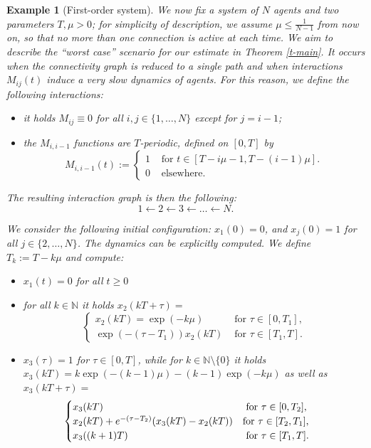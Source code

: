 \documentclass[journal]{article}
\newtheorem{example}{Example}
\begin{document}
 
\begin{example}[First-order system]\label{ex-1}We now fix a system of $N$ agents and two parameters $T,\mu>0$; for simplicity of description, we assume $\mu\leq \frac1{N-1}$ from now on, so that no more than one connection is active at each time. We aim to describe the ``worst case'' scenario for our estimate in Theorem \ref{t-main}.  It occurs when the connectivity graph is reduced to a single path and when interactions $M_{ij}(t)$ induce a very slow dynamics of agents. For this reason, we define the following interactions:
\begin{itemize}
\item it holds $M_{ij}\equiv 0$ for all $i,j\in\{1,\ldots,N\}$ except for $j=i-1$;
\item the $M_{i,i-1}$ functions are $T$-periodic, defined on $[0,T]$ by
\begin{equation}M_{i,i-1}(t):=\begin{cases}
1&\mbox{~for $t\in [T-i\mu-1,T-(i-1)\mu]$.}\\
0&\mbox{~elsewhere.}
\end{cases}\label{e-Mex}
\end{equation}
\end{itemize}
The resulting interaction graph is then the following:
$$1\leftarrow 2\leftarrow 3\leftarrow \ldots\leftarrow N.$$

We consider the following initial configuration: $x_1(0)=0$, and $x_j(0)=1$ for all $j\in\{2,\ldots,N\}$. The dynamics can be explicitly computed. We define $T_k:=T-k\mu$ and compute:
\begin{itemize}
\item $x_1(t)=0$ for all $t\geq 0$
\item for all $k\in\mathbb{N}$ it holds $x_2(kT+\tau)=$
$$\begin{cases}
x_2(kT)=\exp(-k\mu)&\mbox{ for $\tau\in[0,T_{1}]$,}\\
\exp(-(\tau-T_{1}))x_2(kT)&\mbox{ for $\tau\in[T_{1},T]$.}
\end{cases}$$

\item $x_3(\tau)=1$ for $\tau\in[0,T]$, while for $k\in\mathbb{N}\setminus\{0\}$ it holds $x_3(kT)=k\exp(-(k-1)\mu)-(k-1)\exp(-k\mu)$ as well as
$x_3(kT+\tau)=$
$$\hspace{-5mm}\begin{cases}
x_3(kT)&\mbox{ for $\tau\in[0,T_{2}]$,}\\
x_2(kT)+e^{-(\tau-T_{2})}(x_3(kT)-x_2(kT))&\mbox{for $\tau\in[T_{2},T_{1}]$,}\\
x_3((k+1)T)&\mbox{ for $\tau\in[T_{1},T]$.}
\end{cases}$$


\end{itemize}
\end{example}
\end{document}
